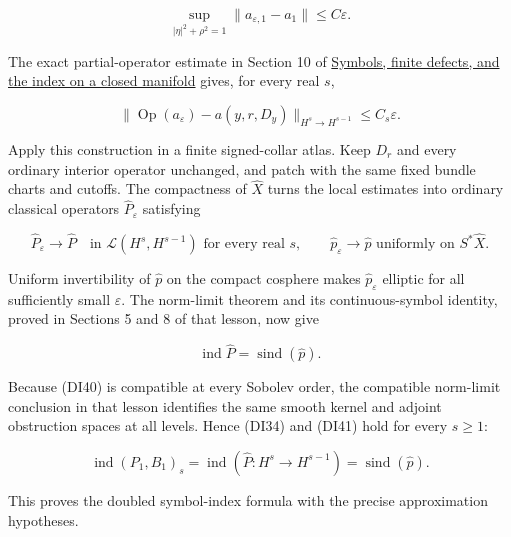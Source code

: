\documentclass[
  11pt,
]{article}
\makeatletter
\let\ReaderOriginalAnchorStart\hyper@anchorstart
\let\ReaderOriginalAnchorEnd\hyper@anchorend
\let\ReaderPendingAliases\@empty
\def\ReaderArmAliases#1{\gdef\ReaderPendingAliases{#1}}
\def\hyper@anchorstart#1{\ReaderIfNativeAnchorTF{#1}{\ReaderPendingAliases\global\let\ReaderPendingAliases\@empty}{}\ReaderOriginalAnchorStart{#1}}
\makeatother
\begin{document}
\[
 \sup_{|\eta|^2+\rho^2=1}
 \|a_{\varepsilon,1}-a_1\|\leq C\varepsilon.
 \tag{DI38}
\]

The exact partial-operator estimate in Section 10 of
\href{global-elliptic-symbol-index.pdf}{Symbols, finite defects, and the
index on a closed manifold} gives, for every real \(s\),

\[
 \|\operatorname{Op}(a_\varepsilon)-a(y,r,D_y)\|
       _{H^s\to H^{s-1}}\leq C_s\varepsilon.
 \tag{DI39}
\]

Apply this construction in a finite signed-collar atlas. Keep \(D_r\)
and every ordinary interior operator unchanged, and patch with the same
fixed bundle charts and cutoffs. The compactness of \(\widehat X\) turns
the local estimates into ordinary classical operators
\(\widehat P_\varepsilon\) satisfying

\[
 \widehat P_\varepsilon\longrightarrow\widehat P
 \quad\text{in }\mathcal L(H^s,H^{s-1})
 \text{ for every real }s,\qquad
 \widehat p_\varepsilon\longrightarrow\widehat p
 \text{ uniformly on }S^*\widehat X.
 \tag{DI40}
\]

Uniform invertibility of \(\widehat p\) on the compact cosphere makes
\(\widehat p_\varepsilon\) elliptic for all sufficiently small
\(\varepsilon\). The norm-limit theorem and its continuous-symbol
identity, proved in Sections 5 and 8 of that lesson, now give

\[
 \operatorname{ind}\widehat P
       =\operatorname{sind}(\widehat p).
 \tag{DI41}
\]

Because (DI40) is compatible at every Sobolev order, the compatible
norm-limit conclusion in that lesson identifies the same smooth kernel
and adjoint obstruction spaces at all levels. Hence (DI34) and (DI41)
hold for every \(s\geq1\):

\[
 \boxed{\operatorname{ind}(P_1,B_1)_s
       =\operatorname{ind}(\widehat P:H^s\to H^{s-1})
       =\operatorname{sind}(\widehat p).}
 \tag{DI42}
\]

This proves the doubled symbol-index formula with the precise
approximation hypotheses.

\ReaderArmAliases{\ReaderOriginalAnchorStart{AN03-SDI-009}\ReaderOriginalAnchorEnd\begingroup\expandafter\def\csname @currentHref\endcsname{AN03-SDI-009}\label{AN03-SDI-009}\endgroup\ReaderOriginalAnchorStart{9-the-two-exact-kinds-of-doubled-index-datum}\ReaderOriginalAnchorEnd\begingroup\expandafter\def\csname @currentHref\endcsname{9-the-two-exact-kinds-of-doubled-index-datum}\label{9-the-two-exact-kinds-of-doubled-index-datum}\endgroup\ReaderOriginalAnchorStart{the-two-exact-kinds-of-doubled-index-datum}\ReaderOriginalAnchorEnd}
\end{document}
